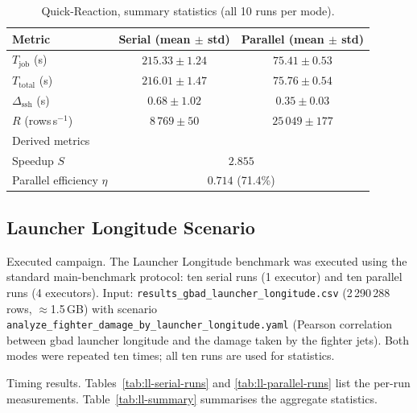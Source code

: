\begin{table}[htbp]
\centering
\caption{Quick-Reaction, summary statistics (all 10 runs per mode).}
\label{tab:qr-summary}
\begin{tabular}{lcc}
\toprule
Metric & Serial (mean $\pm$ std) & Parallel (mean $\pm$ std) \\
\midrule
$T_{\text{job}}$ (s)    & $215.33 \pm 1.24$   & $75.41 \pm 0.53$    \\
$T_{\text{total}}$ (s)  & $216.01 \pm 1.47$   & $75.76 \pm 0.54$    \\
$\Delta_{\text{ssh}}$ (s) & $0.68 \pm 1.02$   & $0.35 \pm 0.03$     \\
$R$ (rows\,s$^{-1}$)    & $8\,769 \pm 50$   & $25\,049 \pm 177$     \\
\midrule
\multicolumn{3}{l}{Derived metrics} \\
Speedup $S$             & \multicolumn{2}{c}{$2.855$} \\
Parallel efficiency $\eta$ & \multicolumn{2}{c}{$0.714$ (71.4\%)} \\
\bottomrule
\end{tabular}
\end{table}

\subsection{Launcher Longitude Scenario}
\label{subsec:eval-ll}

Executed campaign.
The Launcher Longitude benchmark was executed using the standard main-benchmark
protocol: ten serial runs (1 executor) and ten parallel runs (4 executors).
Input: \texttt{results\_gbad\_launcher\_longitude.csv} (2\,290\,288 rows, $\approx$1.5\,GB) with
scenario \texttt{analyze\_fighter\_damage\_by\_launcher\_longitude.yaml} (Pearson correlation
between \gls{gbad} launcher longitude and the damage taken by the fighter jets).
Both modes were repeated ten times; all ten runs are used for statistics.

Timing results.
Tables~\ref{tab:ll-serial-runs} and \ref{tab:ll-parallel-runs} list the per-run
measurements.  Table~\ref{tab:ll-summary} summarises the aggregate statistics.

